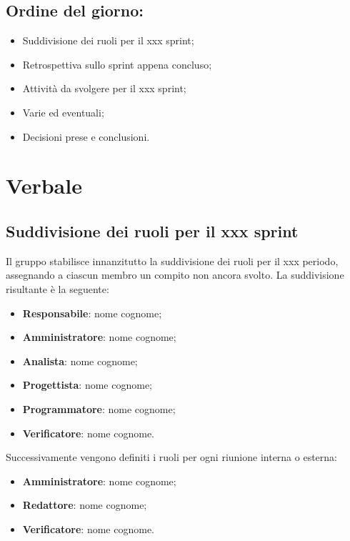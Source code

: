 \documentclass[italian,12pt]{article}
\begin{document}
\subsection*{Ordine del giorno:}
\begin{itemize}
	\item Suddivisione dei ruoli per il xxx sprint; %
	\item Retrospettiva sullo sprint appena concluso;
	\item Attività da svolgere per il xxx sprint; %
	\item Varie ed eventuali;  %
	\item Decisioni prese e conclusioni.
\end{itemize}


\newpage

\section{Verbale}

\subsection{Suddivisione dei ruoli per il xxx sprint} %
Il gruppo stabilisce innanzitutto la suddivisione dei ruoli per il xxx periodo, assegnando a ciascun membro un compito non ancora svolto. La suddivisione risultante è la seguente: %
\begin{itemize}
	\item \textbf{Responsabile}: nome cognome;
	\item \textbf{Amministratore}: nome cognome;
	\item \textbf{Analista}: nome cognome;
	\item \textbf{Progettista}: nome cognome;
	\item \textbf{Programmatore}: nome cognome;
	\item \textbf{Verificatore}: nome cognome.
\end{itemize}
Successivamente vengono definiti i ruoli per ogni riunione interna o esterna:
\begin{itemize}
	\item \textbf{Amministratore}: nome cognome;
	\item \textbf{Redattore}: nome cognome;
	\item \textbf{Verificatore}: nome cognome.
\end{itemize}
\end{document}
